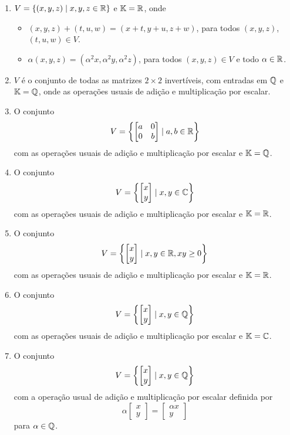 \documentclass[12pt]{exam}
\begin{document}
\begin{exercicio}
\begin{enumerate}[label={\alph*)}]
    \item $V = \{(x, y, z) \mid x, y, z \in \mathbb{R}\}$ e $\mathbb{K} = \mathbb{R}$, onde
      \begin{itemize}
        \item $(x, y, z) + (t, u, w) = (x + t, y + u, z + w)$, para todos $(x, y, z)$, $(t, u, w) \in V$.
        \item $\alpha(x, y, z) = (\alpha^2 x, \alpha^2 y, \alpha^2 z)$, para todos $(x, y, z) \in V$ e todo $\alpha \in \mathbb{R}$.
      \end{itemize}

    \item $V$ é o conjunto de todas as matrizes $2 \times 2$ invertíveis, com entradas em $\mathbb{Q}$ e $\mathbb{K} = \mathbb{Q}$, onde as operações usuais de adição e multiplicação por escalar.

    \item O conjunto
      \[
        V = \left\{\begin{bmatrix}a & 0\\0 & b \end{bmatrix} \mid a, b \in \mathbb{R}\right\}
      \]
      com as operações usuais de adição e multiplicação por escalar e $\mathbb{K} = \mathbb{Q}$.

    \item O conjunto
      \[
         V = \left\{\begin{bmatrix}x\\y \end{bmatrix} \mid x, y \in \mathbb{C}\right\}
      \]
      com as operações usuais de adição e multiplicação por escalar e $\mathbb{K} = \mathbb{R}$.

    \item O conjunto
      \[
         V = \left\{\begin{bmatrix}x\\y \end{bmatrix} \mid x, y \in \mathbb{R}, xy \ge 0\right\}
      \]
      com as operações usuais de adição e multiplicação por escalar e $\mathbb{K} = \mathbb{R}$.

    \item O conjunto
      \[
         V = \left\{\begin{bmatrix}x\\y \end{bmatrix} \mid x, y \in \mathbb{Q}\right\}
      \]
      com as operações usuais de adição e multiplicação por escalar e  $\mathbb{K} = \mathbb{C}$.

    \item O conjunto
      \[
         V = \left\{\begin{bmatrix}x\\y \end{bmatrix} \mid x, y \in \mathbb{Q}\right\}
      \]
      com a operação usual de adição e multiplicação por escalar definida por
      \[
        \alpha\begin{bmatrix}x\\y\end{bmatrix} = \begin{bmatrix}\alpha x\\y\end{bmatrix}
      \]
      para $\alpha \in \mathbb{Q}$.
      

\end{enumerate}
\end{exercicio}
\end{document}
